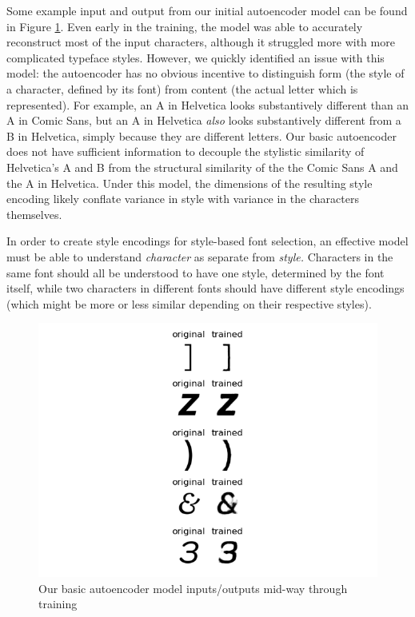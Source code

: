 Some example input and output from our initial autoencoder model can be found in Figure \ref{fig:autoencoder-example}. Even early in the training, the model was able to accurately reconstruct most of the input characters, although it struggled more with more complicated typeface styles. However, we quickly identified an issue with this model: the autoencoder has no obvious incentive to distinguish form (the style of a character, defined by its font) from content (the actual letter which is represented). For example, an { A} in Helvetica looks substantively different than an { A} in Comic Sans, but an { A} in Helvetica \textit{also} looks substantively different from a { B} in Helvetica, simply because they are different letters. Our basic autoencoder does not have sufficient information to decouple the stylistic similarity of Helvetica's { A} and { B} from the structural similarity of the the Comic Sans { A} and the { A} in Helvetica. Under this model, the dimensions of the resulting style encoding likely conflate variance in style with variance in the characters themselves.

In order to create style encodings for style-based font selection, an effective model must be able to understand \emph{character} as separate from \emph{style.} Characters in the same font should all be understood to have one style, determined by the font itself, while two characters in different fonts should have different style encodings (which might be more or less similar depending on their respective styles).

\begin{figure}[H]
    \centering
    \includegraphics[width=\textwidth]{images/autoencoder-example.png}
    \caption{Our basic autoencoder model inputs/outputs mid-way through training}
    \label{fig:autoencoder-example}
\end{figure}

